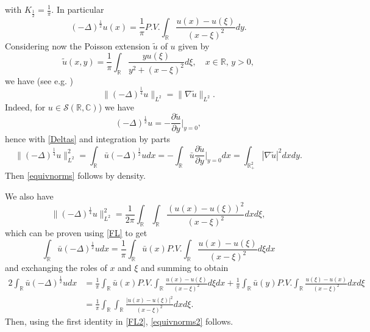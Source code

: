 \documentclass[12pt, a4paper]{article}
\newcommand{\M}[1]{\mathcal{#1}}
\newcommand{\de}{\partial}
\newcommand{\R}{\mathbb{R}}
\renewcommand{\(}{\left(}
\renewcommand{\)}{\right)}
\begin{document}
with $K_{\frac{1}{2}}=\frac{1}{\pi}$. In particular
\begin{equation}\label{FL}
(-\Delta)^\frac{1}{2}u(x)=\frac{1}{\pi} P.V.\int_{\R}\frac{u(x)-u(\xi)}{(x-\xi)^2}dy.
\end{equation}
Considering now the Poisson extension $\tilde u$ of $u$ given by
$$\tilde u(x,y)=\frac{1}{\pi}\int_\R\frac{yu(\xi)}{y^2+(x-\xi)^2}d\xi,\quad x\in \R, \,y>0,$$
we have (see e.g. \cite[Prop. A.1]{ManMar})
\begin{equation}\label{equivnorms}
\|(-\Delta)^\frac14 u \|_{L^2} =\|\nabla\tilde u\|_{L^2}.
\end{equation}
Indeed, for $u\in \M{S}(\R,\mathbb{C})$) we have
$$(-\Delta)^\frac12 u=- \frac{\de \tilde u}{\partial y}\bigg|_{y=0}, $$
hence with \eqref{Deltas} and integration by parts
\begin{equation}\label{FL2}
\|(-\Delta)^\frac14 u\|_{L^2}^2= \int_{\R} \bar u(-\Delta)^\frac12 u dx =-\int_{\R}\bar u \frac{\de \tilde u}{\de y}\bigg|_{y=0}dx =\int_{\R^2_+}|\nabla \tilde u|^2 dxdy.
\end{equation}
Then \eqref{equivnorms} follows by density.

We also have
\begin{equation}\label{equivnorms2}
\|(-\Delta)^\frac14 u \|_{L^2}^2= \frac{1}{2\pi}\int_\R\int_\R\frac{(u(x)-u(\xi))^2}{(x-\xi)^2}dxd\xi,
\end{equation}
which can be proven using \eqref{FL} to get
$$\int_\R \bar u(-\Delta)^\frac12 u dx=\frac{1}{\pi}\int_{\R}  \bar u(x)  P.V.\int_{\R}\frac{u(x)-u(\xi)}{(x-\xi)^2}d\xi dx$$
and exchanging the roles of $x$ and $\xi$ and summing to obtain
\begin{align*}
2\int_\R \bar u(-\Delta)^\frac12 u dx&=\frac{1}{\pi}\int_{\R}  \bar u(x)  P.V.\int_{\R}\frac{u(x)-u(\xi)}{(x-\xi)^2}d\xi dx  +\frac{1}{\pi}\int_{\R}  \bar u(y)  P.V.\int_{\R}\frac{u(\xi)-u(x)}{(x-\xi)^2}dx d\xi\\
&=\frac{1}{\pi}\int_{\R}\int_\R\frac{|u(x)-u(\xi)|^2}{(x-\xi)^2}dxd\xi.
\end{align*}
Then, using the first identity in \eqref{FL2}, \eqref{equivnorms2} follows.

\medskip
\end{document}
